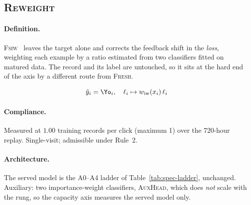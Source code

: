 \subsection{\textsc{Reweight}}\label{app:m-FSIW}

\paragraph{Definition.} \textsc{Fsiw}~\cite{yasui2020feedback} leaves the target alone and corrects the
   feedback shift in the \emph{loss}, weighting each example by a ratio estimated from two
   classifiers fitted on matured data. The record and its label are untouched, so it sits at the
   hard end of the axis by a different route from \textsc{Fresh}.

\begin{equation}
\tilde y_i = \Yo_i,\quad \ell_i \mapsto w_{\text{iw}}(x_i)\,\ell_i
\end{equation}

\begin{center}\end{center}

\paragraph{Compliance.} Measured at $1.00$ training records per click (maximum 1) over the 720-hour replay. Single-visit; admissible under Rule~2.

\paragraph{Architecture.} The served model is the A0--A4 ladder of Table~\ref{tab:spec-ladder}, unchanged. Auxiliary: two importance-weight classifiers, \textsc{AuxHead}, which does \emph{not} scale with the rung, so the capacity axis measures the served model only.

